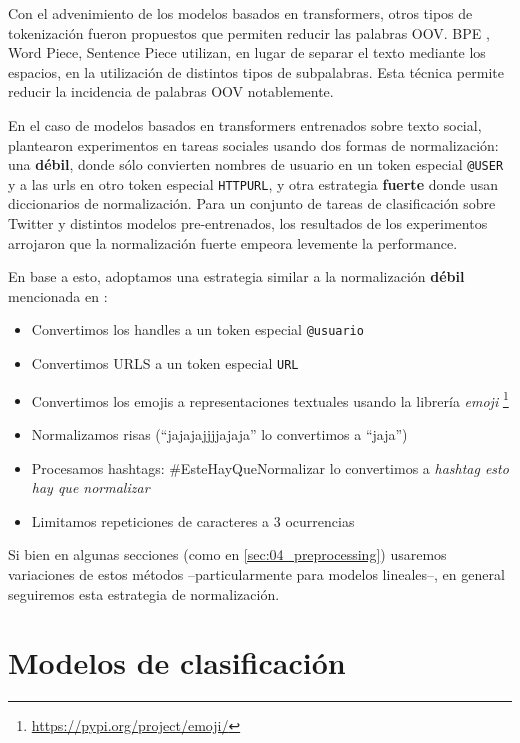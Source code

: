 Con el advenimiento de los modelos basados en transformers, otros tipos de tokenización fueron propuestos que permiten reducir las palabras OOV. BPE \cite{sennrich2016neural}, Word Piece, Sentence Piece \cite{kudo-richardson-2018-sentencepiece} utilizan, en lugar de separar el texto mediante los espacios, en la utilización de distintos tipos de subpalabras. Esta técnica permite reducir la incidencia de palabras OOV notablemente.

En el caso de modelos basados en transformers entrenados sobre texto social, \citet{dat2020bertweet} plantearon experimentos en tareas sociales usando dos formas de normalización: una \textbf{débil}, donde sólo convierten nombres de usuario en un token especial \verb|@USER| y a las urls en otro token especial \verb|HTTPURL|, y otra estrategia \textbf{fuerte} donde usan diccionarios de normalización. Para un conjunto de tareas de clasificación sobre Twitter y distintos modelos pre-entrenados, los resultados de los experimentos arrojaron que la normalización fuerte empeora levemente la performance.

En base a esto, adoptamos una estrategia similar a la normalización \textbf{débil} mencionada en \citet{dat2020bertweet}:

\begin{itemize}
    \item Convertimos los handles a un token especial \verb|@usuario|
    \item Convertimos URLS a un token especial \verb|URL|
    \item Convertimos los emojis a representaciones textuales usando la librería \emph{emoji} \footnote{\url{https://pypi.org/project/emoji/}}
    \item Normalizamos risas (``jajajajjjjajaja'' lo convertimos a ``jaja'')
    \item Procesamos hashtags: \#EsteHayQueNormalizar lo convertimos a \emph{hashtag esto hay que normalizar}
    \item Limitamos repeticiones de caracteres a 3 ocurrencias
\end{itemize}

Si bien en algunas secciones (como en \ref{sec:04_preprocessing}) usaremos variaciones de estos métodos --particularmente para modelos lineales--, en general seguiremos esta estrategia de normalización.

\section{Modelos de clasificación}
\label{sec:03_classification}

